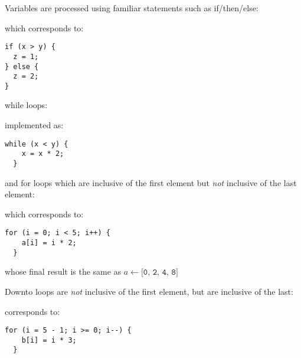 \clearpage

\noindent
Variables are processed using familiar statements such as if/then/else:
\par
\noindent
\begin{algorithm}[H]
  \DontPrintSemicolon
\end{algorithm}
\par
\noindent
which corresponds to:
\begin{Verbatim}[xleftmargin=.25in]
if (x > y) {
  z = 1;
} else {
  z = 2;
}
\end{Verbatim}
while loops:
\par
\noindent
\begin{algorithm}[H]
  \DontPrintSemicolon
\end{algorithm}
\par
\noindent
implemented as:
\begin{Verbatim}[xleftmargin=.25in]
  while (x < y) {
    x = x * 2;
  }
\end{Verbatim}
and for loops which are inclusive of the first element
but \textit{not} inclusive of the last element:
\par
\noindent
\begin{algorithm}[H]
  \DontPrintSemicolon
\end{algorithm}
\par
\noindent
which corresponds to:
\begin{Verbatim}[xleftmargin=.25in]
  for (i = 0; i < 5; i++) {
    a[i] = i * 2;
  }
\end{Verbatim}
whose final result is the same as $a \leftarrow \texttt{[0, 2, 4, 8]}$
\par
\noindent
Downto loops are \textit{not} inclusive of the first element,
but are inclusive of the last:
\par
\noindent
\begin{algorithm}[H]
  \DontPrintSemicolon
\end{algorithm}
\par
\noindent
corresponds to:
\begin{Verbatim}[xleftmargin=.25in]
  for (i = 5 - 1; i >= 0; i--) {
    b[i] = i * 3;
  }
\end{Verbatim}

